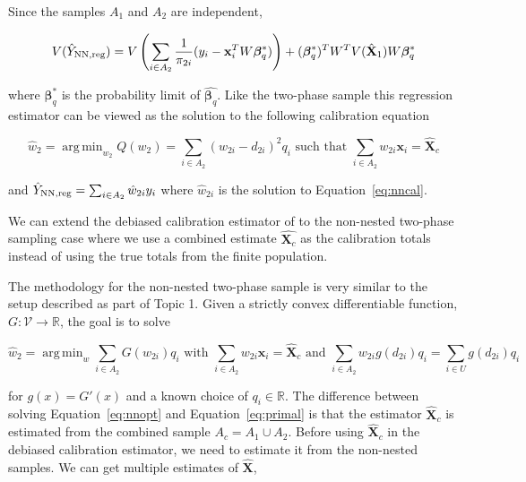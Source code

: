 \documentclass[12pt]{article}
\DeclareMathOperator*{\argmin}{arg\,min}
\renewcommand{\bf}[1]{\mathbf{#1}}
\begin{document}
Since the samples $A_1$ and $A_2$ are independent, 

$$
V(\hat Y_{\rm NN, reg}) = 
V\left(\sum_{i \in A_2} \frac{1}{\pi_{2i}}(y_i - \bf x_i^TW\bm \beta^*_q)\right)
+ (\bm \beta^*_q)^T W^T V(\hat{\bf X}_1) W \bm \beta_q^*
$$

where $\bm \beta_q^*$ is the probability limit of $\hat{\bm \beta_q}$. Like the
two-phase sample this regression estimator can be viewed as the solution to the
following calibration equation 

\begin{equation}\label{eq:nncal}
  \hat w_2 = \argmin_{w_2} Q(w_2) = \sum_{i \in A_2} (w_{2i} - d_{2i})^2 q_i 
  \text{ such that } \sum_{i \in A_2} w_{2i} \bf x_i = \hat{\bf X}_c
\end{equation}

and $\hat Y_{\rm NN, reg} = \sum_{i \in A_2} \hat w_{2i} y_i$ where $\hat
w_{2i}$ is the solution to Equation~\ref{eq:nncal}.

We can extend the debiased calibration estimator of \cite{kwon2024debiased} to
the non-nested two-phase sampling case where we use a combined estimate
$\hat{\bm X_c}$ as the calibration totals instead of using the true totals from
the finite population.


The methodology for the non-nested two-phase sample is very similar to the setup
described as part of Topic 1. Given a strictly convex differentiable function,
$G: \mathcal{V} \to \mathbb{R}$, the goal is to solve

\begin{equation}\label{eq:nnopt}
\hat w_2 = \argmin_w \sum_{i \in A_2} G\left(w_{2i}\right) q_i 
\text{ with } 
\sum_{i \in A_2} w_{2i} \bf x_i = \hat{\bf X}_{c} \text{ and } 
\sum_{i \in A_2} w_{2i} g(d_{2i}) q_i = \sum_{i \in U} g(d_{2i}) q_i
\end{equation}

for $g(x) = G'(x)$ and a known choice of $q_i \in \mathbb{R}$. 
The difference
between solving Equation~\ref{eq:nnopt} and Equation~\ref{eq:primal} is that the
estimator $\hat{\bf X}_c$ is estimated from the combined sample $A_c = A_1 \cup
A_2$. Before using $\hat{\bf X}_c$ in the debiased calibration estimator, we
need to estimate it from the non-nested samples. We can get multiple estimates
of $\hat{\bf X}$, 
\end{document}
